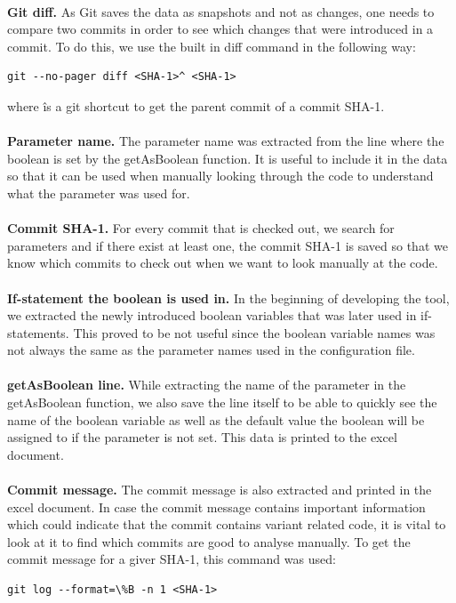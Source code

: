 \paragraph*{}
\textbf{Git diff.} As Git saves the data as snapshots and not as changes, one needs to compare two commits in order to see which changes that were introduced in a commit. To do this, we use the built in diff command in the following way:
\lstset{language=Bash}
\begin{lstlisting}[frame=single]
git --no-pager diff <SHA-1>^ <SHA-1>
\end{lstlisting}
where \^ is a git shortcut to get the parent commit of a commit SHA-1.
\paragraph*{}
\textbf{Parameter name.} The parameter name was extracted from the line where the boolean is set by the getAsBoolean function. It is useful to include it in the data so that it can be used when manually looking through the code to understand what the parameter was used for.
\paragraph*{}
\textbf{Commit SHA-1.} For every commit that is checked out, we search for parameters and if there exist at least one, the commit SHA-1 is saved so that we know which commits to check out when we want to look manually at the code.
\paragraph*{}
\textbf{If-statement the boolean is used in.} In the beginning of developing the tool, we extracted the newly introduced boolean variables that was later used in if-statements. This proved to be not useful since the boolean variable names was not always the same as the parameter names used in the configuration file.
\paragraph*{}
\textbf{getAsBoolean line.} While extracting the name of the parameter in the getAsBoolean function, we also save the line itself to be able to quickly see the name of the boolean variable as well as the default value the boolean will be assigned to if the parameter is not set. This data is printed to the excel document.
\paragraph*{}
\textbf{Commit message.} The commit message is also extracted and printed in the excel document. In case the commit message contains important information which could indicate that the commit contains variant related code, it is vital to look at it to find which commits are good to analyse manually.
To get the commit message for a giver SHA-1, this command was used:
\lstset{language=Bash}
\begin{lstlisting}[frame=single]
git log --format=\%B -n 1 <SHA-1>
\end{lstlisting}

